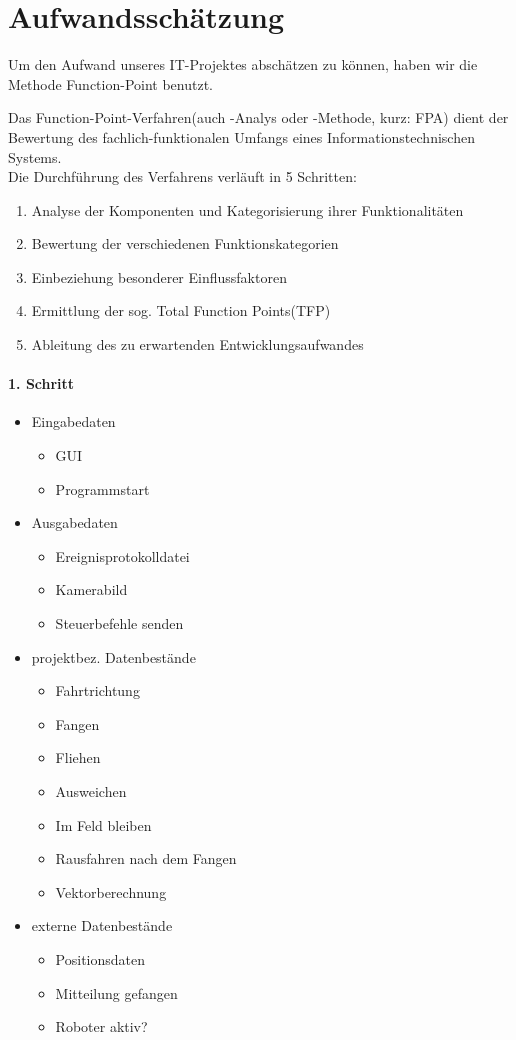 \section{Aufwandsschätzung}
Um den Aufwand unseres IT-Projektes abschätzen zu können, haben wir die Methode Function-Point benutzt.

Das Function-Point-Verfahren(auch -Analys oder -Methode, kurz: FPA) dient der Bewertung des fachlich-funktionalen Umfangs eines Informationstechnischen Systems.\\
\newline
Die Durchführung des Verfahrens verläuft in 5 Schritten:
\begin{enumerate}
	\item Analyse der Komponenten und Kategorisierung ihrer Funktionalitäten
	\item Bewertung der verschiedenen Funktionskategorien
	\item Einbeziehung besonderer Einflussfaktoren
	\item Ermittlung der sog. Total Function Points(TFP)
	\item Ableitung des zu erwartenden Entwicklungsaufwandes
\end{enumerate}
\vspace{0.2cm}
\paragraph{1. Schritt}
\begin{itemize}
	\item Eingabedaten
	\begin{itemize}
		\item GUI
		\item Programmstart
	\end{itemize}
	\item Ausgabedaten
	\begin{itemize}
		\item Ereignisprotokolldatei
		\item Kamerabild
		\item Steuerbefehle senden
	\end{itemize}
	\item projektbez. Datenbestände
	\begin{itemize}
		\item Fahrtrichtung
		\item Fangen
		\item Fliehen
		\item Ausweichen
		\item Im Feld bleiben
		\item Rausfahren nach dem Fangen
		\item Vektorberechnung
	\end{itemize}
	\item externe Datenbestände
	\begin{itemize}
		\item Positionsdaten
		\item Mitteilung gefangen
		\item Roboter aktiv?
	\end{itemize}
\end{itemize}

